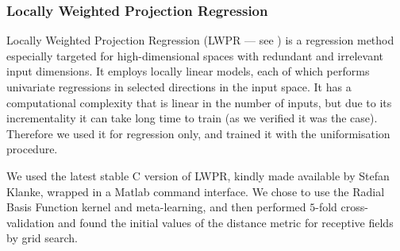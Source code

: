 \subsubsection{Locally Weighted Projection Regression}

Locally Weighted Projection Regression (LWPR --- see \cite{lwpr}) is a
regression method especially targeted for high-dimensional
spaces with redundant and irrelevant input dimensions. It employs
locally linear models, each of which performs univariate regressions
in selected directions in the input space. It has a computational
complexity that is linear in the number of inputs, but due to its
incrementality it can take long time to train (as we verified it was
the case). Therefore we used it for regression only, and trained it
with the uniformisation procedure.

We used the latest stable C version of LWPR, kindly made available by
Stefan Klanke, wrapped in a Matlab command interface. We chose to use
the Radial Basis Function kernel and meta-learning, and then
performed $5$-fold cross-validation and found the initial values of
the distance metric for receptive fields by grid search.
